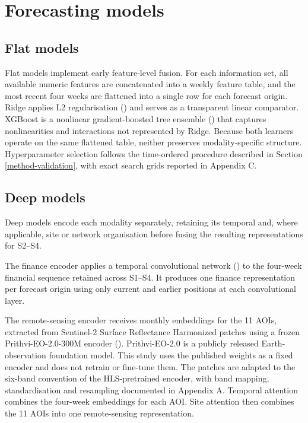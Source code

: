 \documentclass[
  british,
  12pt,
  oneside]{book}
\begin{document}
\section{Forecasting models}\label{method-models}

\subsection{Flat models}\label{method-flat}

Flat models implement early feature-level fusion. For each information set, all available numeric features are concatenated into a weekly feature table, and the most recent four weeks are flattened into a single row for each forecast origin. Ridge applies L2 regularisation () and serves as a transparent linear comparator. XGBoost is a nonlinear gradient-boosted tree ensemble () that captures nonlinearities and interactions not represented by Ridge. Because both learners operate on the same flattened table, neither preserves modality-specific structure. Hyperparameter selection follows the time-ordered procedure described in Section \ref{method-validation}, with exact search grids reported in Appendix C.

\subsection{Deep models}\label{method-deep}

Deep models encode each modality separately, retaining its temporal and, where applicable, site or network organisation before fusing the resulting representations for S2--S4.

The finance encoder applies a temporal convolutional network () to the four-week financial sequence retained across S1--S4. It produces one finance representation per forecast origin using only current and earlier positions at each convolutional layer.

The remote-sensing encoder receives monthly embeddings for the 11 AOIs, extracted from Sentinel-2 Surface Reflectance Harmonized patches using a frozen Prithvi-EO-2.0-300M encoder (). Prithvi-EO-2.0 is a publicly released Earth-observation foundation model. This study uses the published weights as a fixed encoder and does not retrain or fine-tune them. The patches are adapted to the six-band convention of the HLS-pretrained encoder, with band mapping, standardisation and resampling documented in Appendix A. Temporal attention combines the four-week embeddings for each AOI. Site attention then combines the 11 AOIs into one remote-sensing representation.
\end{document}
